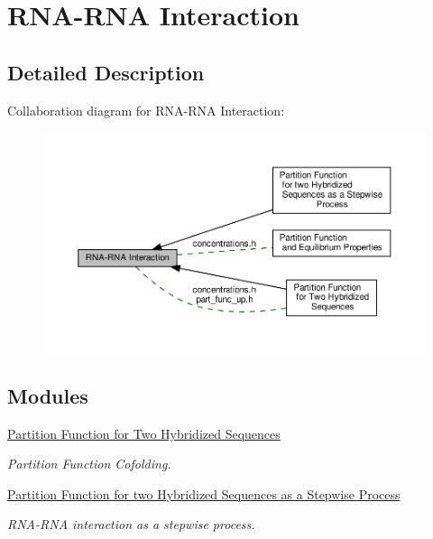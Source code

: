 \hypertarget{group__cofold}{}\section{R\+N\+A-\/\+R\+NA Interaction}
\label{group__cofold}


\subsection{Detailed Description}
Collaboration diagram for R\+N\+A-\/\+R\+NA Interaction\+:
\nopagebreak
\begin{figure}[H]
\begin{center}
\leavevmode
\includegraphics[width=350pt]{group__cofold}
\end{center}
\end{figure}
\subsection*{Modules}
\begin{DoxyCompactItemize}
\item 
\hyperlink{group__pf__cofold}{Partition Function for Two Hybridized Sequences}
\begin{DoxyCompactList}\small\item\em Partition Function Cofolding. \end{DoxyCompactList}\item 
\hyperlink{group__up__cofold}{Partition Function for two Hybridized Sequences as a Stepwise Process}
\begin{DoxyCompactList}\small\item\em R\+N\+A-\/\+R\+NA interaction as a stepwise process. \end{DoxyCompactList}\end{DoxyCompactItemize}
